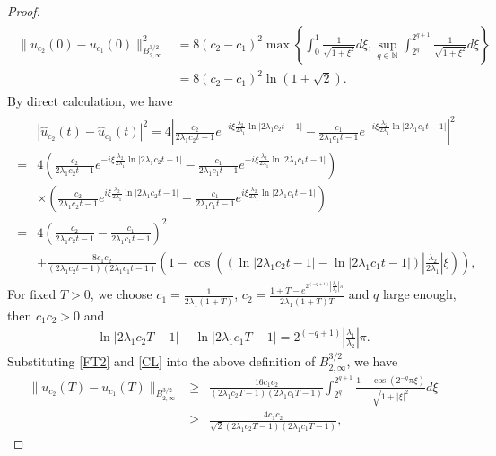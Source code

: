 \documentclass[11pt]{article}
\begin{document}
\begin{proof}
\begin{eqnarray}
\begin{aligned}\label{uc0}
\|u_{c_2}(0)-u_{c_1}(0)\|_{B_{2,\infty}^{3/2}}^2&=8(c_2-c_1)^2\max\left\{\int_{0}^1\frac{1}{\sqrt{1+\xi^2}}d\xi
,\sup_{q\in\mathbb{N}} \int_{2^q}^{2^{q+1}}\frac{1}{\sqrt{1+\xi^2}}d\xi\right\}\\
&=8(c_2-c_1)^2\ln(1+\sqrt{2}).
\end{aligned}
\end{eqnarray}
By direct calculation, we have
\begin{eqnarray}
\begin{aligned}\label{FT2}
&|\hat{u}_{c_2}(t)-\hat{u}_{c_1}(t)|^2=4\left|\frac{c_2}{2\lambda_1c_2t-1}e^{-i\xi\frac{\lambda_2}{2\lambda_1} \ln|2\lambda_1c_2t-1|}-\frac{c_1}{2\lambda_1c_1t-1}e^{-i\xi\frac{\lambda_2}{2\lambda_1} \ln|2\lambda_1c_1t-1|}\right|^2\\ 
=&4\left(\frac{c_2}{2\lambda_1c_2t-1}e^{-i\xi \frac{\lambda_2}{2\lambda_1}\ln|2\lambda_1c_2t-1|}
-\frac{c_1}{2\lambda_1c_1t-1}e^{-i\xi \frac{\lambda_2}{2\lambda_1}\ln|2\lambda_1c_1t-1|}\right)\\
&\times\left(\frac{c_2}{2\lambda_1c_2t-1}e^{i\xi\frac{\lambda_2}{2\lambda_1} \ln|2\lambda_1c_2t-1|}
-\frac{c_1}{2\lambda_1c_1t-1}e^{i\xi\frac{\lambda_2}{2\lambda_1} \ln|2\lambda_1c_1t-1|}\right)
\\=&4\left(\frac{c_2}{2\lambda_1c_2t-1}-\frac{c_1}{2\lambda_1c_1t-1}\right)^2\\
&+\frac{8c_1c_2}{(2\lambda_1c_2t-1)(2\lambda_1c_1t-1)}
\left(1-\cos\left((\ln|2\lambda_1c_2t-1|-\ln|2\lambda_1c_1t-1|)\left|\frac{\lambda_2}{2\lambda_1}\right|\xi\right)\right),
\end{aligned}
\end{eqnarray}
For fixed $T>0$, we choose $c_1=\frac{1}{2\lambda_1(1+T)}$, $c_2=\frac{1+T-e^{2^{(-q+1)}\left|\tfrac{\lambda_1}{\lambda_2}\right|\pi}}{2\lambda_1(1+T)T}$ and $q$ large enough, 
then $c_1c_2>0$ and
\begin{eqnarray}\label{CL}
	\ln|2\lambda_1c_2T-1|-\ln|2\lambda_1c_1T-1|=2^{(-q+1)}\left|\tfrac{\lambda_1}{\lambda_2}\right|\pi.
\end{eqnarray}
Substituting \eqref{FT2} and \eqref{CL} into the above definition of $B_{2,\infty}^{3/2}$, we have
\begin{eqnarray*}
\|u_{c_2}(T)-u_{c_1}(T)\|_{B_{2,\infty}^{3/2}}&\geq& \frac{16c_1c_2}{(2\lambda_1c_2T-1)(2\lambda_1c_1T-1)}\int_{2^q}^{2^{q+1}}\frac{1-\cos(2^{-q}\pi\xi)}{\sqrt{1+|\xi|^2}}d\xi\\
&\geq& \frac{4c_1c_2}{\sqrt{2}(2\lambda_1c_2T-1)(2\lambda_1c_1T-1)},

\end{eqnarray*}
\end{proof}
\end{document}
